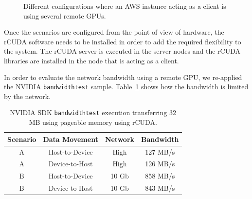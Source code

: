 \documentclass[a4paper,twoside]{article}
\begin{document}
\begin{figure}[ht]
\centering
{}
\quad
{}
\caption{Different configurations where an AWS instance acting as a client is using several remote GPUs.}
\label{fig:aws}
\end{figure}

Once the scenarios are configured from the point of view of hardware, 
the {rCUDA} software needs to be installed in order to add 
the required flexibility to the system. The {rCUDA} server is 
executed in the server nodes and the {rCUDA} libraries are installed 
in the node that is acting as a client.

In order to evaluate the network bandwidth using 
a remote GPU, we re-applied the NVIDIA {\tt bandwidthtest} sample.
Table~\ref{table:bwtrcuda} shows how the bandwidth is limited 
by the network.

\begin{table}[htb]
\renewcommand{\arraystretch}{1.3}
\caption{NVIDIA SDK {\tt bandwidthtest} execution transferring 32 MB using pageable memory using {rCUDA}.}
\label{table:bwtrcuda}
\tabcolsep=0.09cm
\begin{center}\begin{tabular}{cccc}
Scenario &  Data Movement & Network & Bandwidth \\ \hline \hline
A & Host-to-Device & High& 127 MB/s \\ \hline
A & Device-to-Host & High& 126 MB/s\\ \hline
B & Host-to-Device & 10 Gb& 858 MB/s\\ \hline
B & Device-to-Host & 10 Gb& 843 MB/s\\ \hline
\end{tabular}\end{center}\end{table}
\end{document}
